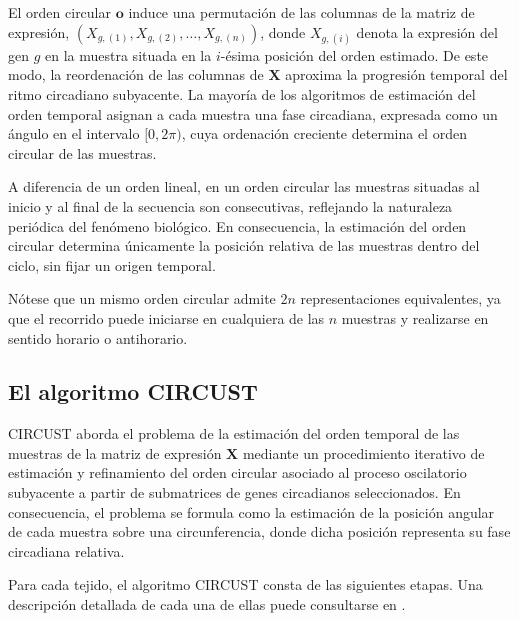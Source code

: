 \documentclass[12pt, a4paper]{report}
\begin{document}
El orden circular \(\mathbf{o}\) induce una permutación de las columnas de la matriz de expresión, \(\left(X_{g,(1)},X_{g,(2)},\ldots,X_{g,(n)}\right)\), donde \(X_{g,(i)}\) denota la expresión del gen \(g\) en la muestra situada en la \(i\)-ésima posición del orden estimado. De este modo, la reordenación de las columnas de \(\mathbf{X}\) aproxima la progresión temporal del ritmo circadiano subyacente. La mayoría de los algoritmos de estimación del orden temporal asignan a cada muestra una fase circadiana, expresada como un ángulo en el intervalo \([0,2\pi)\), cuya ordenación creciente determina el orden circular de las muestras.

A diferencia de un orden lineal, en un orden circular las muestras situadas al inicio y al final de la secuencia son consecutivas, reflejando la naturaleza periódica del fenómeno biológico. En consecuencia, la estimación del orden circular determina únicamente la posición relativa de las muestras dentro del ciclo, sin fijar un origen temporal.

Nótese que un mismo orden circular admite \(2n\) representaciones equivalentes, ya que el recorrido puede iniciarse en cualquiera de las \(n\) muestras y realizarse en sentido horario o antihorario.


\subsection{El algoritmo CIRCUST}
\label{sec:circust}

CIRCUST \cite{larriba2023} aborda el problema de la estimación del orden temporal de las muestras de la matriz de expresión $\mathbf{X}$ mediante un procedimiento iterativo de estimación y refinamiento del orden circular asociado al proceso oscilatorio subyacente a partir de submatrices de genes circadianos seleccionados. En consecuencia, el problema se formula como la estimación de la posición angular de cada muestra sobre una circunferencia, donde dicha posición representa su fase circadiana relativa. 

Para cada tejido, el algoritmo CIRCUST consta de las siguientes etapas. Una descripción detallada de cada una de ellas puede consultarse en \citet{larriba2023}.
\end{document}
